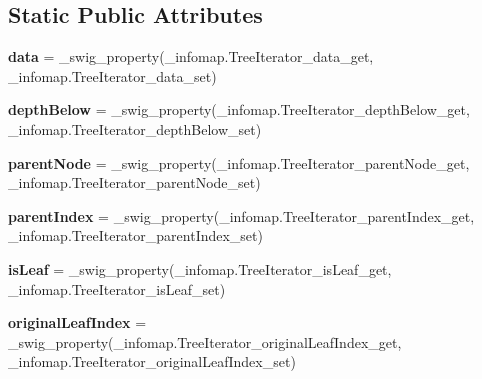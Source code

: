 \subsection*{Static Public Attributes}
\begin{DoxyCompactItemize}
\item 
\mbox{\label{classinfomap_1_1TreeIterator_afb0056b8e01c063a3ee5db8abbae7bb0}} 
{\bfseries data} = \+\_\+swig\+\_\+property(\+\_\+infomap.\+Tree\+Iterator\+\_\+data\+\_\+get, \+\_\+infomap.\+Tree\+Iterator\+\_\+data\+\_\+set)
\item 
\mbox{\label{classinfomap_1_1TreeIterator_a96fdf66b3f533c6f0ffdddfbdda3cdde}} 
{\bfseries depth\+Below} = \+\_\+swig\+\_\+property(\+\_\+infomap.\+Tree\+Iterator\+\_\+depth\+Below\+\_\+get, \+\_\+infomap.\+Tree\+Iterator\+\_\+depth\+Below\+\_\+set)
\item 
\mbox{\label{classinfomap_1_1TreeIterator_a74f789f8ac9ab7f7954b95f80f953c68}} 
{\bfseries parent\+Node} = \+\_\+swig\+\_\+property(\+\_\+infomap.\+Tree\+Iterator\+\_\+parent\+Node\+\_\+get, \+\_\+infomap.\+Tree\+Iterator\+\_\+parent\+Node\+\_\+set)
\item 
\mbox{\label{classinfomap_1_1TreeIterator_a42837ec827a9b7731f3064bb56d47a8e}} 
{\bfseries parent\+Index} = \+\_\+swig\+\_\+property(\+\_\+infomap.\+Tree\+Iterator\+\_\+parent\+Index\+\_\+get, \+\_\+infomap.\+Tree\+Iterator\+\_\+parent\+Index\+\_\+set)
\item 
\mbox{\label{classinfomap_1_1TreeIterator_a21c2eea62b65b87d0c437e6e7e313a17}} 
{\bfseries is\+Leaf} = \+\_\+swig\+\_\+property(\+\_\+infomap.\+Tree\+Iterator\+\_\+is\+Leaf\+\_\+get, \+\_\+infomap.\+Tree\+Iterator\+\_\+is\+Leaf\+\_\+set)
\item 
\mbox{\label{classinfomap_1_1TreeIterator_a353c3468f633214acfcb2c714828a6fc}} 
{\bfseries original\+Leaf\+Index} = \+\_\+swig\+\_\+property(\+\_\+infomap.\+Tree\+Iterator\+\_\+original\+Leaf\+Index\+\_\+get, \+\_\+infomap.\+Tree\+Iterator\+\_\+original\+Leaf\+Index\+\_\+set)
\item 
\mbox{\label{classinfomap_1_1TreeIterator_a416aeb07f3741a48272ec09a6c5a1e45}} 

\end{DoxyCompactItemize}
